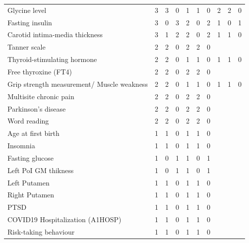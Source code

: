 \documentclass{article}\usepackage[]{graphicx}\usepackage[dvipsnames]{xcolor}
\begin{document}
\begin{longtable}{p{6cm}|p{1.5cm}|p{1.5cm}|p{1.5cm}p{1.5cm}|p{1.5cm}|p{1.5cm}|p{1.5cm}|p{1.5cm}|p{1.5cm}}
  Glycine level &   3 &   3 &   0 &   1 &   1 &   0 &   2 &   2 &   0 \\ 
  Fasting insulin &   3 &   0 &   3 &   2 &   0 &   2 &   1 &   0 &   1 \\ 
  Carotid intima-media thickness &   3 &   1 &   2 &   2 &   0 &   2 &   1 &   1 &   0 \\ 
  Tanner scale &   2 &   2 &   0 &   2 &   2 &   0 &  &  &  \\ 
  Thyroid-stimulating hormone &   2 &   2 &   0 &   1 &   1 &   0 &   1 &   1 &   0 \\ 
  Free thyroxine (FT4) &   2 &   2 &   0 &   2 &   2 &   0 &  &  &  \\ 
  Grip strength measurement/ Muscle weakness &   2 &   2 &   0 &   1 &   1 &   0 &   1 &   1 &   0 \\ 
  Multisite chronic pain &   2 &   2 &   0 &   2 &   2 &   0 &  &  &  \\ 
  Parkinson's disease &   2 &   2 &   0 &   2 &   2 &   0 &  &  &  \\ 
  Word reading &   2 &   2 &   0 &   2 &   2 &   0 &  &  &  \\ 
  Age at first birth &   1 &   1 &   0 &   1 &   1 &   0 &  &  &  \\ 
  Insomnia &   1 &   1 &   0 &   1 &   1 &   0 &  &  &  \\ 
  Fasting glucose &   1 &   0 &   1 &   1 &   0 &   1 &  &  &  \\ 
  Left PoI GM thikness &   1 &   0 &   1 &   1 &   0 &   1 &  &  &  \\ 
  Left Putamen &   1 &   1 &   0 &   1 &   1 &   0 &  &  &  \\ 
  Right Putamen &   1 &   1 &   0 &   1 &   1 &   0 &  &  &  \\ 
  PTSD &   1 &   1 &   0 &   1 &   1 &   0 &  &  &  \\ 
  COVID19 Hospitalization (A1HOSP) &   1 &   1 &   0 &   1 &   1 &   0 &  &  &  \\ 
  Risk-taking behaviour &   1 &   1 &   0 &   1 &   1 &   0 &  &  &  \\ 
   \hline
 \end{longtable}
  
  
\end{document}
